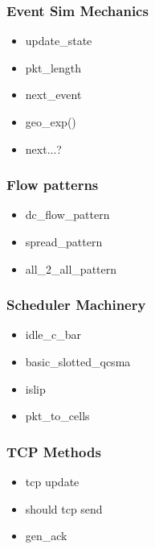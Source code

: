 \documentclass[11pt]{article}%
\begin{document}
\subsubsection{Event Sim Mechanics}
\begin{itemize}
\item update\_state
\item pkt\_length
\item next\_event
\item geo\_exp()
\item next...?
\end{itemize}

\subsubsection{Flow patterns}
\begin{itemize}
\item dc\_flow\_pattern
\item spread\_pattern
\item all\_2\_all\_pattern
\end{itemize}

\subsubsection{Scheduler Machinery}
\begin{itemize}
\item idle\_c\_bar
\item basic\_slotted\_qcsma
\item islip
\item pkt\_to\_cells
\end{itemize}

\subsubsection{TCP Methods}
\begin{itemize}
\item tcp update
\item should tcp send
\item gen\_ack
\end{itemize}
\end{document}
